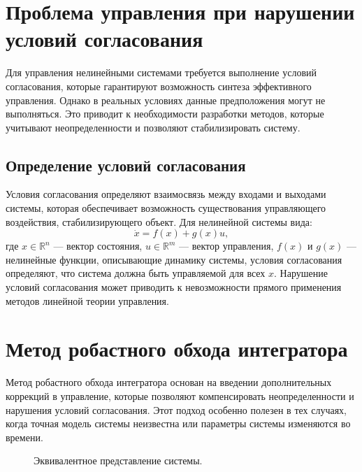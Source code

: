 \documentclass[a4paper,14pt]{extarticle} %
\begin{document}
\newpage
\section{Проблема управления при нарушении условий согласования}
Для управления нелинейными системами требуется выполнение условий согласования, которые гарантируют возможность синтеза эффективного управления. Однако в реальных условиях данные предположения могут не выполняться. Это приводит к необходимости разработки методов, которые учитывают неопределенности и позволяют стабилизировать систему.

\subsection{Определение условий согласования}
Условия согласования определяют взаимосвязь между входами и выходами системы, которая обеспечивает возможность существования управляющего воздействия, стабилизирующего объект. Для нелинейной системы вида:
\begin{equation}
    \dot{x} = f(x) + g(x)u,
\end{equation}
где \(x \in \mathbb{R}^n\) — вектор состояния, \(u \in \mathbb{R}^m\) — вектор управления, \(f(x)\) и \(g(x)\) — нелинейные функции, описывающие динамику системы, условия согласования определяют, что система должна быть управляемой для всех \(x\). Нарушение условий согласования может приводить к невозможности прямого применения методов линейной теории управления.

\newpage
\section{Метод робастного обхода интегратора}
Метод робастного обхода интегратора основан на введении дополнительных коррекций в управление, которые позволяют компенсировать неопределенности и нарушения условий согласования. Этот подход особенно полезен в тех случаях, когда точная модель системы неизвестна или параметры системы изменяются во времени.

\begin{figure}[h]
\caption{Эквивалентное представление системы.}
\label{1.png:image}
\end{figure}
\end{document}
